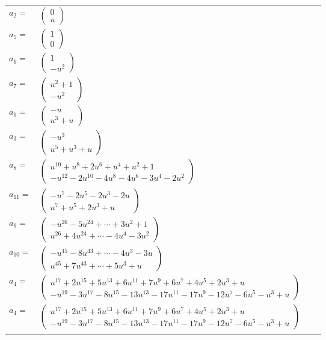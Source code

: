 \documentclass[1p]{elsarticle_modified}
\theoremstyle{definition}
\begin{document}
\begin{tabular}{m{7pt} m{180pt} m{7pt} m{180pt} }
\flushright $a_{2}=$&$\begin{pmatrix}0\\u\end{pmatrix}$ \\
\flushright $a_{5}=$&$\begin{pmatrix}1\\0\end{pmatrix}$ \\
\flushright $a_{6}=$&$\begin{pmatrix}1\\- u^2\end{pmatrix}$ \\
\flushright $a_{7}=$&$\begin{pmatrix}u^2+1\\- u^2\end{pmatrix}$ \\
\flushright $a_{1}=$&$\begin{pmatrix}- u\\u^3+u\end{pmatrix}$ \\
\flushright $a_{3}=$&$\begin{pmatrix}- u^3\\u^5+u^3+u\end{pmatrix}$ \\
\flushright $a_{8}=$&$\begin{pmatrix}u^{10}+u^8+2 u^6+u^4+u^2+1\\- u^{12}-2 u^{10}-4 u^8-4 u^6-3 u^4-2 u^2\end{pmatrix}$ \\
\flushright $a_{11}=$&$\begin{pmatrix}- u^7-2 u^5-2 u^3-2 u\\u^7+u^5+2 u^3+u\end{pmatrix}$ \\
\flushright $a_{9}=$&$\begin{pmatrix}- u^{26}-5 u^{24}+\cdots+3 u^2+1\\u^{26}+4 u^{24}+\cdots-4 u^4-3 u^2\end{pmatrix}$ \\
\flushright $a_{10}=$&$\begin{pmatrix}- u^{45}-8 u^{43}+\cdots-4 u^3-3 u\\u^{45}+7 u^{43}+\cdots+5 u^3+u\end{pmatrix}$ \\
\flushright $a_{4}=$&$\begin{pmatrix}u^{17}+2 u^{15}+5 u^{13}+6 u^{11}+7 u^9+6 u^7+4 u^5+2 u^3+u\\- u^{19}-3 u^{17}-8 u^{15}-13 u^{13}-17 u^{11}-17 u^9-12 u^7-6 u^5- u^3+u\end{pmatrix}$\\ \flushright $a_{4}=$&$\begin{pmatrix}u^{17}+2 u^{15}+5 u^{13}+6 u^{11}+7 u^9+6 u^7+4 u^5+2 u^3+u\\- u^{19}-3 u^{17}-8 u^{15}-13 u^{13}-17 u^{11}-17 u^9-12 u^7-6 u^5- u^3+u\end{pmatrix}$\\&\end{tabular}
\end{document}
